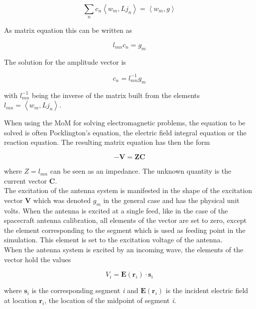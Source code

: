 \documentclass[draft,ras]{agutex}
\begin{document}
\begin{article}
\begin{equation}
 \sum_{n} c_n \left\langle w_m, L j_n\right\rangle = \left\langle w_m, g \right\rangle
\end{equation}

As matrix equation this can be written as

\begin{equation}
 l_{mn}c_n=g_m
\end{equation}

The solution for the amplitude vector is

\begin{equation}
 c_n=l_{mn}^{-1}g_m
\end{equation}

with $l_{mn}^{-1}$ being the inverse of the matrix built from the elements $l_{mn}=\left\langle w_m, L j_n\right\rangle$.

When using the MoM for solving electromagnetic problems, the equation to be solved is often Pocklington's equation, the electric field integral equation or the reaction equation. The resulting matrix equation has then the form


\begin{equation}\label{eq:mom}
- \mathbf{V}=\mathbf{ZC}
\end{equation}

where $Z=l_{mn}$ can be seen as an impedance. The unknown quantity is the current vector $\mathbf{C}$. \\

The excitation of the antenna system is manifested in the shape of the excitation vector $\mathbf{V}$ which was denoted $g_m$ in the general case and has the physical unit volts. When the antenna is excited at a single feed, like in the case of the spacecraft antenna calibration, all elements of the vector are set to zero, except the element corresponding to the segment which is used as feeding point in the simulation. This element is set to the excitation voltage of the antenna.\\


When the antenna system is excited by an incoming wave, the elements of the vector hold the values

\begin{equation}
 V_i=\mathbf{E(r_\mathit{i})} \cdot \mathbf{s_\mathit{i}}
\end{equation}

where $\mathbf{s_\mathit{i}}$ is the corresponding segment \textit{i} and $\mathbf{E(r_\mathit{i})}$ is the incident electric field at location $\mathbf{r}_\mathit{i}$, the location of the midpoint of segment \textit{i}.


\end{article}
\end{document}
